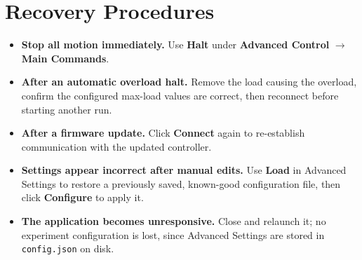 \documentclass[12pt]{report}
\begin{document}
\section{Recovery Procedures}
\begin{itemize}
    \item \textbf{Stop all motion immediately.} Use \textbf{Halt} under \textbf{Advanced Control} $\rightarrow$ \textbf{Main Commands}.
    \item \textbf{After an automatic overload halt.} Remove the load causing the overload, confirm the configured max-load values are correct, then reconnect before starting another run.
    \item \textbf{After a firmware update.} Click \textbf{Connect} again to re-establish communication with the updated controller.
    \item \textbf{Settings appear incorrect after manual edits.} Use \textbf{Load} in Advanced Settings to restore a previously saved, known-good configuration file, then click \textbf{Configure} to apply it.
    \item \textbf{The application becomes unresponsive.} Close and relaunch it; no experiment configuration is lost, since Advanced Settings are stored in \texttt{config.json} on disk.
\end{itemize}
\end{document}

